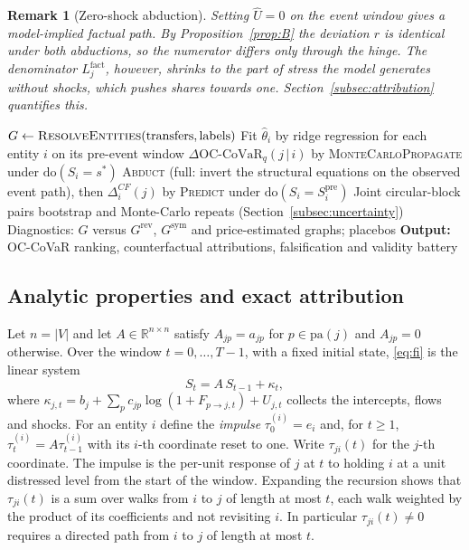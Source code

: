 \documentclass[referee,pdflatex,sn-mathphys-ay]{sn-jnl}
\theoremstyle{thmstyleone}%
\theoremstyle{thmstyletwo}%
\newtheorem{remark}{Remark}%
\theoremstyle{thmstylethree}%
\newcommand{\doop}{\mathrm{do}}
\newcommand{\pa}{\mathrm{pa}}
\newcommand{\OCCoVaR}{\text{OC-CoVaR}}
\begin{document}
\begin{remark}[Zero-shock abduction]
Setting $\hat U=0$ on the event window gives a model-implied factual path. By Proposition~\ref{prop:B}
the deviation $r$ is identical under both abductions, so the numerator differs only through the
hinge. The denominator $L_j^{\mathrm{fact}}$, however, shrinks to the part of stress the model
generates without shocks, which pushes shares towards one. Section~\ref{subsec:attribution} quantifies this.
\end{remark}

\begin{algorithm}[tbp]
\caption{VEIN end-to-end pipeline}
\label{alg:vein}
\begin{algorithmic}[1]
\State $G \gets \textsc{ResolveEntities}(\text{transfers}, \text{labels})$ 
\State Fit $\hat\theta_i$ by ridge regression for each entity $i$ on its pre-event window
\State $\Delta\OCCoVaR_q(j\,|\,i)$ by \textsc{MonteCarloPropagate} under $\doop(S_i=s^\ast)$
\State \textsc{Abduct} (full: invert the structural equations on the observed event path), then $\Delta_i^{CF}(j)$ by \textsc{Predict} under $\doop(S_i=S_i^{\text{pre}})$
\State Joint circular-block pairs bootstrap and Monte-Carlo repeats (Section~\ref{subsec:uncertainty})
\State Diagnostics: $G$ versus $G^{\mathrm{rev}}$, $G^{\mathrm{sym}}$ and price-estimated graphs; placebos
\State \textbf{Output:} OC-CoVaR ranking, counterfactual attributions, falsification and validity battery
\end{algorithmic}
\end{algorithm}

\subsection{Analytic properties and exact attribution}
\label{subsec:analytic}
Let $n=|V|$ and let $A\in\mathbb{R}^{n\times n}$ satisfy $A_{jp}=a_{jp}$ for
$p\in\pa(j)$ and $A_{jp}=0$ otherwise. Over the window $t=0,\dots,T-1$, with a fixed
initial state, \eqref{eq:fi} is the linear system
\begin{equation}
\label{eq:linear}
S_t = A\,S_{t-1}+\kappa_t,
\end{equation}
where $\kappa_{j,t}=b_j+\sum_p c_{jp}\log(1+F_{p\to j,t})+U_{j,t}$ collects the
intercepts, flows and shocks. For an entity $i$ define the \emph{impulse}
$\tau^{(i)}_0=e_i$ and, for $t\ge1$, $\tau^{(i)}_t=A\tau^{(i)}_{t-1}$ with its
$i$-th coordinate reset to one. Write $\tau_{ji}(t)$ for the $j$-th coordinate. The
impulse is the per-unit response of $j$ at $t$ to holding $i$ at a unit distressed
level from the start of the window. Expanding the recursion shows that $\tau_{ji}(t)$
is a sum over walks from $i$ to $j$ of length at most $t$, each walk weighted by the
product of its coefficients and not revisiting $i$. In particular $\tau_{ji}(t)\neq0$
requires a directed path from $i$ to $j$ of length at most $t$.
\end{document}
